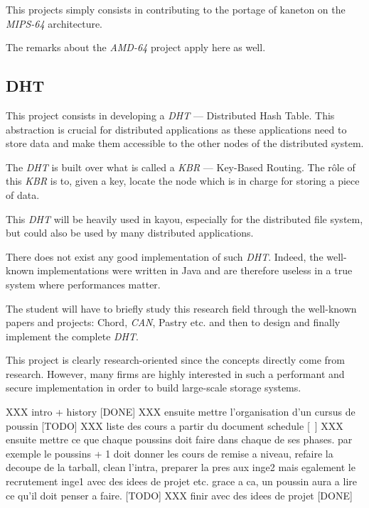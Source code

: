 \begin{multicols}{2}
This projects simply consists in contributing to the portage of kaneton
on the \textit{MIPS-64} architecture.

The remarks about the \textit{AMD-64} project apply here as well.

%
%

\subsection{DHT}

This project consists in developing a \textit{DHT} --- Distributed Hash Table.
This abstraction is crucial for distributed applications as these applications
need to store data and make them accessible to the other nodes of the
distributed system.

The \textit{DHT} is built over what is called a \textit{KBR} --- Key-Based
Routing. The r\^ole of this \textit{KBR} is to, given a key, locate the
node which is in charge for storing a piece of data.

This \textit{DHT} will be heavily used in kayou, especially for the distributed
file system, but could also be used by many distributed applications.

There does not exist any good implementation of such \textit{DHT}. Indeed,
the well-known implementations were written in Java and are therefore
useless in a true system where performances matter.

The student will have to briefly study this research field through the
well-known papers and projects: Chord, \textit{CAN}, Pastry etc. and then
to design and finally implement the complete \textit{DHT}.

This project is clearly research-oriented since the concepts directly come
from research. However, many firms are highly interested in such a
performant and secure implementation in order to build large-scale storage
systems.

\end{multicols}



%
%

XXX intro + history [DONE]
XXX ensuite mettre l'organisation d'un cursus de poussin [TODO]
XXX liste des cours a partir du document schedule [~]
XXX ensuite mettre ce que chaque poussins doit faire dans chaque de
    ses phases. par exemple le poussins + 1 doit donner les cours de remise
    a niveau, refaire la decoupe de la tarball, clean l'intra, preparer la
    pres aux inge2 mais egalement le recrutement inge1 avec des idees de
    projet etc. grace a ca, un poussin aura a lire ce qu'il doit penser
    a faire. [TODO]
XXX finir avec des idees de projet [DONE]

